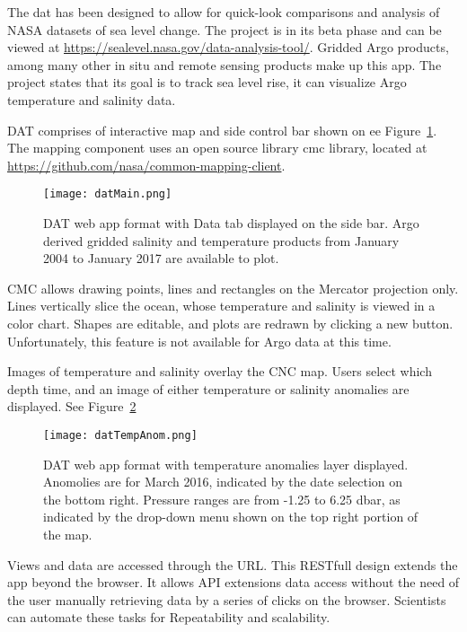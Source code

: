 The \gls{dat} has been designed to allow for quick-look comparisons and analysis of NASA datasets of sea level change. The project is in its beta phase and can be viewed at \url{https://sealevel.nasa.gov/data-analysis-tool/}\cite{nasaSLR}. Gridded Argo products, among many other in situ and remote sensing products make up this app. The project states that its goal is to track sea level rise, it can visualize Argo temperature and salinity data. 

DAT comprises of interactive map and side control bar shown on ee Figure~\ref{fig:dat}. The mapping component uses an open source library \gls{cmc} library, located at \url{https://github.com/nasa/common-mapping-client}.

\begin{figure}
\begin{minipage}{6in}
\centering
\texttt{[image: datMain.png]}
\caption{\label{fig:dat} DAT web app format with Data tab displayed on the side bar. Argo derived gridded salinity and temperature products from January 2004 to January 2017 are available to plot.}
\end{minipage}
\end{figure}

CMC allows drawing points, lines and rectangles on the Mercator projection only. Lines vertically slice the ocean, whose temperature and salinity is viewed in a color chart. Shapes are editable, and plots are redrawn by clicking a new button. Unfortunately, this feature is not available for Argo data at this time.

Images of temperature and salinity overlay the CNC map. Users select which depth time, and an image of either temperature or salinity anomalies are displayed. See Figure~\ref{fig:dat_color_map}

\begin{figure}
\begin{minipage}{6in}
\centering
\texttt{[image: datTempAnom.png]}
\caption{\label{fig:dat_color_map} DAT web app format with temperature anomalies layer displayed. Anomolies are for March 2016, indicated by the date selection on the bottom right. Pressure ranges are from -1.25 to 6.25 dbar, as indicated by the drop-down menu shown on the top right portion of the map.}
\end{minipage}
\end{figure}

Views and data are accessed through the URL. This RESTfull design extends the app beyond the browser. It allows API extensions data access without the need of the user manually retrieving data by a series of clicks on the browser. Scientists can automate these tasks for Repeatability and scalability.

